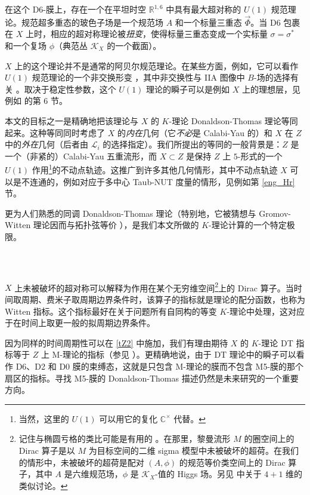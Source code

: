 \documentclass[12pt]{article}
\newcommand{\R}{\mathbb{R}}
\newcommand{\cL}{\mathscr{L}}
\newcommand{\Ct}{\mathbb{C}^{\times}}
\newcommand{\cK}{\mathscr{K}}
\theoremstyle{definition}
\begin{document}
在这个 D6-膜上，存在一个在平坦时空 ${\R}^{1,6}$ 中具有最大超对称的 $U(1)$ 规范理论。规范超多重态的玻色子场是一个规范场 $A$ 和一个标量三重态 ${\vec \Phi}$。当 D6 包裹在 $X$ 上时，相应的超对称理论被\emph{扭变}，使得标量三重态变成一个实标量 ${\sigma} = {\sigma}^{*}$ 和一个复场 $\phi$（典范丛 $\cK_X$ 的一个截面）。

$X$ 上的这个理论并不是通常的阿贝尔规范理论。在某些方面，例如，它可以看作 $U(1)$ 规范理论的一个非交换形变 \cite{Nekrasov:1998ss}，其中非交换性与 IIA 图像中 $B$-场的选择有关 \cite{Witten:2000mf}。取决于稳定性参数，这个 $U(1)$ 理论的瞬子可以是例如 $X$ 上的理想层，见例如 \cite{Iqbal:2003ds} 的第 6 节。

本文的目标之一是精确地把该理论与 $X$ 的 $K$-理论 Donaldson-Thomas 理论等同起来。这种等同同时考虑了 $X$ 的\emph{内在}几何（它\emph{不必}是 Calabi-Yau 的）和 $X$ 在 $Z$ 中的\emph{外在}几何（后者由 $\cL_i$ 的选择指定）。我们所提出的等同的一般背景是：$Z$ 是一个（非紧的）Calabi-Yau 五重流形，而 $X\subset Z$ 是保持 $Z$ 上 $5$-形式的一个 $U(1)$ 作用\footnote{当然，这里的 $U(1)$ 可以用它的复化 $\Ct$ 代替。}的不动点轨迹。这推广到许多其他几何情形，其中不动点轨迹 $X$ 可以是不连通的，例如对应于多中心 Taub-NUT 度量的情形，见例如第 \ref{eng_Hr} 节。

更为人们熟悉的同调 Donaldson-Thomas 理论（特别地，它被猜想与 Gromov-Witten 理论因而与拓扑弦等价 \cite{mnop}），是我们本文所做的 $K$-理论计算的一个特定极限。

\subsubsection{\ }

$X$ 上未被破坏的超对称可以解释为作用在某个无穷维空间\footnote{记住与椭圆亏格的类比可能是有用的 \cite{Witten:1986bf}。在那里，黎曼流形 $M$ 的圈空间上的 Dirac 算子是以 $M$ 为目标空间的二维 sigma 模型中未被破坏的超荷。在我们的情形中，未被破坏的超荷是配对 $(A, {\phi})$ 的规范等价类空间上的 Dirac 算子，其中 $A$ 是六维规范场，${\phi}$ 是 $\cK_X$-值的 Higgs 场。另见 \cite{Nekrasov:1996cz} 中关于 $4+1$ 维的类似讨论。}上的 Dirac 算子。当时间取周期、费米子取周期边界条件时，该算子的指标就是理论的配分函数，也称为 Witten 指标。这个指标最好在关于问题所有自同构的等变 $K$-理论中处理，这对应于在时间上取更一般的拟周期边界条件。

因为同样的时间周期性可以在 \eqref{tZ2} 中施加，我们有理由期待 $X$ 的 $K$-理论 DT 指标等于 $Z$ 上 M-理论的指标（参见 \cite{Losev:1997hx}）。更精确地说，由于 DT 理论中的瞬子可以看作 D6、D2 和 D0 膜的束缚态，这就是只包含 M-理论的膜而不包含 M5-膜的那个扇区的指标。寻找 M5-膜的 Donaldson-Thomas 描述仍然是未来研究的一个重要方向。
\end{document}

